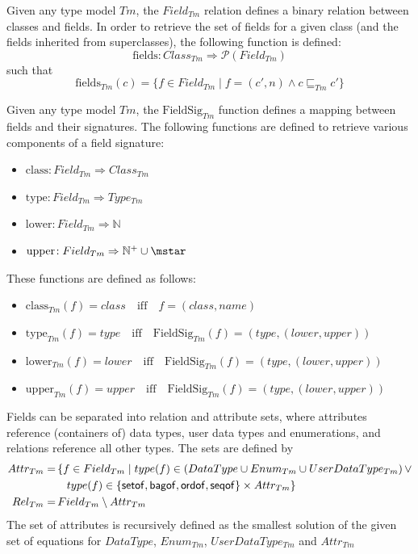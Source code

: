 \begin{defin}[Field]
\label{defin:formalisations:ecore_formalisation:type_models:field}
Given any type model $Tm$, the $Field_{Tm}$ relation defines a binary relation between classes and fields.
In order to retrieve the set of fields for a given class (and the fields inherited from superclasses), the following function is defined:
\begin{equation*}
   \mathrm{fields}\!: Class_{Tm} \Rightarrow \mathcal{P}(Field_{Tm})
\end{equation*}
such that
\begin{equation*}
\mathrm{fields}_{Tm}(c) = \{f \in Field_{Tm} \mid f = ( c', n ) \land c \sqsubseteq_{Tm} c'\}
\end{equation*}

Given any type model $Tm$, the $\mathrm{FieldSig}_{Tm}$ function defines a mapping between fields and their signatures. The following functions are defined to retrieve various components of a field signature:
\begin{itemize}
    \item $\mathrm{class}\!: Field_{Tm} \Rightarrow Class_{Tm}$
    \item $\mathrm{type}\!: Field_{Tm} \Rightarrow Type_{Tm}$
    \item $\mathrm{lower}\!: Field_{Tm} \Rightarrow \mathbb{N}$
    \item $\mathrm{upper}\!: Field_{Tm} \Rightarrow \mathbb{N}^+ \cup {\mstar}$
\end{itemize}
These functions are defined as follows:
\begin{itemize}
    \item $\mathrm{class}_{Tm}(f) = class \quad \mathrm{iff} \quad f = ( class, name)$
    \item $\mathrm{type}_{Tm}(f) = type \quad \mathrm{iff} \quad \mathrm{FieldSig}_{Tm}(f) = ( type, ( lower, upper ) )$
    \item $\mathrm{lower}_{Tm}(f) = lower \quad \mathrm{iff} \quad \mathrm{FieldSig}_{Tm}(f) = ( type, ( lower, upper ) )$
    \item $\mathrm{upper}_{Tm}(f) = upper \quad \mathrm{iff} \quad \mathrm{FieldSig}_{Tm}(f) = ( type, ( lower, upper ) )$
\end{itemize}

Fields can be separated into relation and attribute sets, where attributes reference (containers of) data types, user data types and enumerations, and relations reference all other types. The sets are defined by
\begin{align*}
    Attr_{Tm} =&\, \{f \in Field_{Tm} \mid type(f) \in (DataType \cup Enum_{Tm} \cup UserDataType_{Tm})\,\vee\\&\quad type(f) \in \{ \mathsf{setof}, \mathsf{bagof}, \mathsf{ordof}, \mathsf{seqof} \} \times Attr_{Tm}\}\\
    Rel_{Tm} =&\, Field_{Tm} \setminus Attr_{Tm}
\end{align*}
The set of attributes is recursively defined as the smallest solution of the given set of equations for $DataType$, $Enum_{Tm}$, $UserDataType_{Tm}$ and $Attr_{Tm}$

\end{defin}

